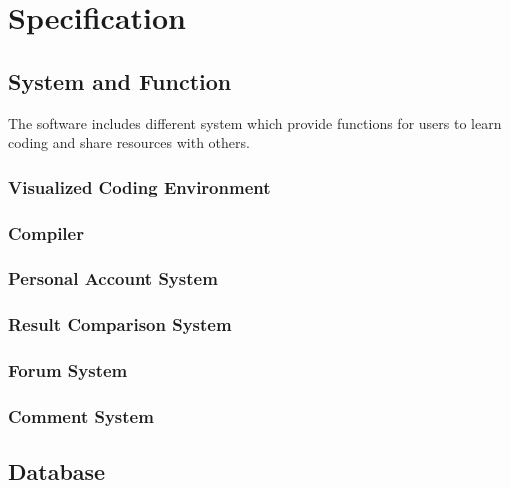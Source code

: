 \chapter{Specification}
\section{System and Function}
The software includes different system which provide functions for users to learn coding and share resources with others.
\subsection{Visualized Coding Environment}
	
\subsection{Compiler}
\subsection{Personal Account System}
	
\subsection{Result Comparison System}
\subsection{Forum System}
\subsection{Comment System}
\section{Database}

